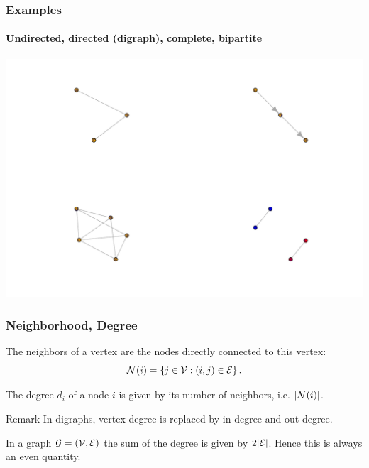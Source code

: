 \documentclass{beamer}\usepackage[]{graphicx}\usepackage[]{color}
\newenvironment{knitrout}{}{} %
\begin{document}
\begin{frame}[fragile]
\frametitle{Examples}
\framesubtitle{Undirected, directed (digraph), complete, bipartite}

\begin{knitrout}\scriptsize
{}\color{fgcolor}
\includegraphics[width=.8\textwidth]{figures/basic_graphs-1} 

\end{knitrout}

\end{frame}

\begin{frame}
  \frametitle{Neighborhood, Degree}

  \begin{definition}[Neighborhood]
    The neighbors of a vertex are the nodes directly connected to this vertex:
    \[
      \mathcal{N}(i) = \left\{j\in\mathcal{V} : (i,j) \in \mathcal{E}\right\}.
    \]
  \end{definition}
  
  \begin{definition}[Degree]
    The degree $d_i$ of a node $i$ is given by its number of neighbors, i.e. $|\mathcal{N}(i)|$.
  \end{definition}

  \begin{block}{Remark}
    In digraphs, vertex degree is replaced by \alert{in-degree} and \alert{out-degree}.
  \end{block}

  \begin{proposition}
    In a graph $\mathcal{G} = (\mathcal{V},\mathcal{E})$ the sum of the degree is given by $2|\mathcal{E}|$. Hence \alert{this is always an even quantity}.
  \end{proposition}
  
  
\end{frame}
\end{document}
